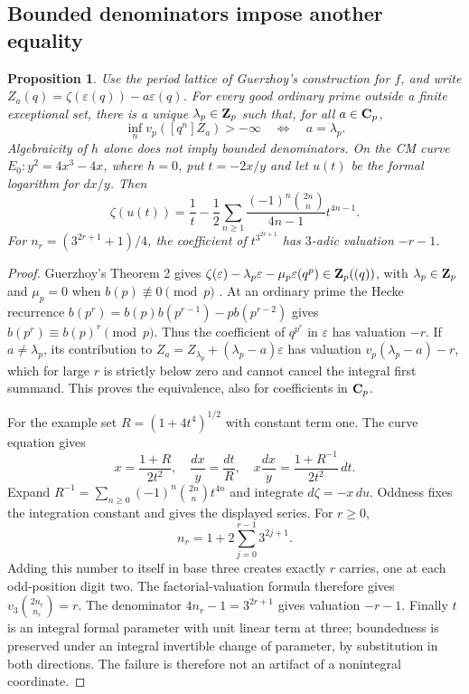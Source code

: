 \documentclass[11pt]{article}
\newtheorem{proposition}[theorem]{Proposition}
\theoremstyle{definition}\newtheorem{definition}[theorem]{Definition}
\theoremstyle{remark}\newtheorem{remark}[theorem]{Remark}
\begin{document}
\subsection{Bounded denominators impose another equality}
\begin{proposition}\label{prop:ordinary-denominator}
Use the period lattice of Guerzhoy's construction for $f$, and write
$Z_a(q)=\zeta(\varepsilon(q))-a\varepsilon(q)$.
For every good ordinary prime outside a finite exceptional set, there is a unique $\lambda_p\in\mathbf Z_p$ such that, for all $a\in\mathbf C_p$,
\[
          \inf_n v_p([q^n]Z_a)>-\infty
                         \quad\Longleftrightarrow\quad a=\lambda_p.
\]
Algebraicity of $h$ alone does not imply bounded denominators. On the CM curve $E_0:y^2=4x^3-4x$, where $h=0$, put $t=-2x/y$ and let $u(t)$ be the formal logarithm for $dx/y$. Then
\[
 \zeta(u(t))=\frac1t-\frac12\sum_{n\ge1}
          \frac{(-1)^n\binom{2n}{n}}{4n-1}t^{4n-1}.
\]
For $n_r=(3^{2r+1}+1)/4$, the coefficient of $t^{3^{2r+1}}$ has $3$-adic valuation $-r-1$.
\end{proposition}
\begin{proof}
Guerzhoy's Theorem 2 gives
$\zeta(\varepsilon)-\lambda_p\varepsilon-\mu_p\varepsilon(q^p)\in\mathbf Z_p((q))$,
with $\lambda_p\in\mathbf Z_p$ and $\mu_p=0$ when $b(p)\not\equiv0\pmod p$ \cite[pp.~4--5]{Guerzhoy}. At an ordinary prime the Hecke recurrence
$b(p^r)=b(p)b(p^{r-1})-p b(p^{r-2})$ gives
$b(p^r)\equiv b(p)^r\pmod p$. Thus the coefficient of $q^{p^r}$ in $\varepsilon$ has valuation $-r$. If $a\ne\lambda_p$, its contribution to
$Z_a=Z_{\lambda_p}+(\lambda_p-a)\varepsilon$
has valuation $v_p(\lambda_p-a)-r$, which for large $r$ is strictly below zero and cannot cancel the integral first summand. This proves the equivalence, also for coefficients in $\mathbf C_p$.

For the example set $R=(1+4t^4)^{1/2}$ with constant term one. The curve equation gives
\[
 x=\frac{1+R}{2t^2},\quad \frac{dx}{y}=\frac{dt}{R},\quad
 x\frac{dx}{y}=\frac{1+R^{-1}}{2t^2}\,dt.
\]
Expand $R^{-1}=\sum_{n\ge0}(-1)^n\binom{2n}{n}t^{4n}$ and integrate $d\zeta=-x\,du$. Oddness fixes the integration constant and gives the displayed series. For $r\ge0$,
\[
 n_r=1+2\sum_{j=0}^{r-1}3^{2j+1}.
\]
Adding this number to itself in base three creates exactly $r$ carries, one at each odd-position digit two. The factorial-valuation formula therefore gives
$v_3\binom{2n_r}{n_r}=r$. The denominator $4n_r-1=3^{2r+1}$ gives valuation $-r-1$. Finally $t$ is an integral formal parameter with unit linear term at three; boundedness is preserved under an integral invertible change of parameter, by substitution in both directions. The failure is therefore not an artifact of a nonintegral coordinate.
\end{proof}
\end{document}
